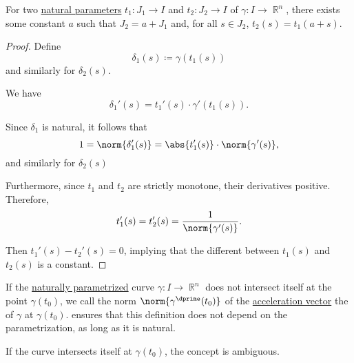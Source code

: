 \begin{proposition}\label{thm:natural_reparametrization_existence}
  For two \hyperref[thm:natural_parametrization_existence]{natural parameters} \( t_1: J_1 \to I \) and \( t_2: J_2 \to I \) of \( \gamma: I \to \BbbR^n \), there exists some constant \( a \) such that \( J_2 = a + J_1 \) and, for all \( s \in J_2 \), \( t_2(s) = t_1(a + s) \).
\end{proposition}
\begin{proof}
  Define
  \begin{equation*}
    \delta_1(s) \coloneqq \gamma(t_1(s))
  \end{equation*}
  and similarly for \( \delta_2(s) \).

  We have
  \begin{equation*}
    \delta_1'(s) = t_1'(s) \cdot \gamma'(t_1(s)).
  \end{equation*}

  Since \( \delta_1 \) is natural, it follows that
  \begin{equation*}
    1 = \norm{\delta_1'(s)} = \abs{t_1'(s)} \cdot \norm{\gamma'(s)},
  \end{equation*}
  and similarly for \( \delta_2(s) \)

  Furthermore, since \( t_1 \) and \( t_2 \) are strictly monotone, their derivatives positive. Therefore,
  \begin{equation*}
    t_1'(s) = t_2'(s) = \frac 1 {\norm{\gamma'(s)}}.
  \end{equation*}

  Then \( t_1'(s) - t_2'(s) = 0 \), implying that the different between \( t_1(s) \) and \( t_2(s) \) is a constant.
\end{proof}

\begin{definition}\label{def:regular_curve_curvature}
  If the \hyperref[thm:natural_reparametrization_existence]{naturally parametrized} curve \( \gamma: I \to \BbbR^n \) does not intersect itself at the point \( \gamma(t_0) \), we call the norm \( \norm{\gamma^\dprime(t_0)} \) of the \hyperref[def:smooth_curve]{acceleration vector} the  of \( \gamma \) at \( \gamma(t_0) \).  ensures that this definition does not depend on the parametrization, as long as it is natural.

  If the curve intersects itself at \( \gamma(t_0) \), the concept is ambiguous.
\end{definition}

